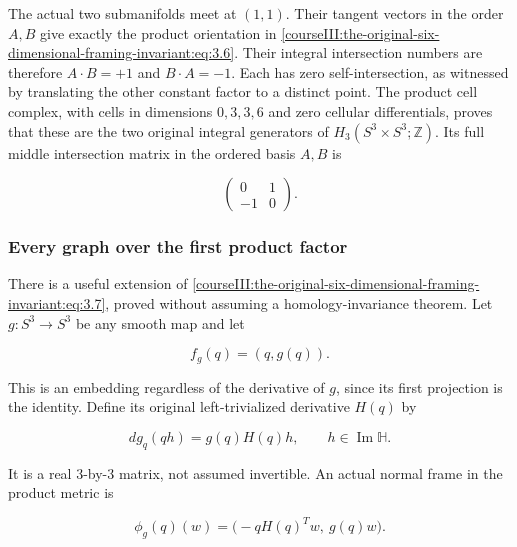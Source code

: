 The actual two submanifolds meet at \((1,1)\). Their tangent vectors in the order \(A,B\) give exactly the product orientation in \eqref{courseIII:the-original-six-dimensional-framing-invariant:eq:3.6}. Their integral intersection numbers are therefore \(A\cdot B=+1\) and \(B\cdot A=-1\). Each has zero self-intersection, as witnessed by translating the other constant factor to a distinct point. The product cell complex, with cells in dimensions \(0,3,3,6\) and zero cellular differentials, proves that these are the two original integral generators of \(H_3(S^3\times S^3;\mathbb Z)\). Its full middle intersection matrix in the ordered basis \(A,B\) is

\begin{equation}
\begin{pmatrix}0&1\\-1&0\end{pmatrix}.
 \label{courseIII:the-original-six-dimensional-framing-invariant:eq:3.11}
\end{equation}

\subsubsection{Every graph over the first product factor}
\label{courseIII:the-original-six-dimensional-framing-invariant:section-3.3}

There is a useful extension of \eqref{courseIII:the-original-six-dimensional-framing-invariant:eq:3.7}, proved without assuming a homology-invariance theorem. Let \(g:S^3\to S^3\) be any smooth map and let

\begin{equation}
f_g(q)=(q,g(q)).
 \label{courseIII:the-original-six-dimensional-framing-invariant:eq:3.12}
\end{equation}

This is an embedding regardless of the derivative of \(g\), since its first projection is the identity. Define its original left-trivialized derivative \(H(q)\) by

\begin{equation}
dg_q(qh)=g(q)H(q)h,\qquad h\in\operatorname{Im}\mathbb H.
 \label{courseIII:the-original-six-dimensional-framing-invariant:eq:3.13}
\end{equation}

It is a real \(3\)-by-\(3\) matrix, not assumed invertible. An actual normal frame in the product metric is

\begin{equation}
\phi_g(q)(w)=\bigl(-qH(q)^Tw,\ g(q)w\bigr).
 \label{courseIII:the-original-six-dimensional-framing-invariant:eq:3.14}
\end{equation}

